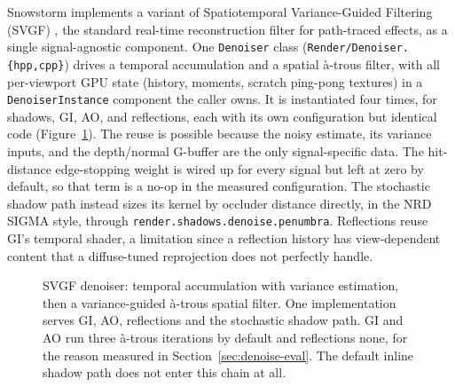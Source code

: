 Snowstorm implements a variant of Spatiotemporal Variance-Guided Filtering (SVGF)
\cite{schied2017svgf}, the standard real-time reconstruction filter for path-traced effects, as a
single signal-agnostic component. One \texttt{Denoiser} class (\texttt{Render/Denoiser.\{hpp,cpp\}})
drives a temporal accumulation and a spatial \`a-trous filter, with all per-viewport GPU state
(history, moments, scratch ping-pong textures) in a \texttt{DenoiserInstance} component the caller
owns. It is instantiated four times, for shadows, GI, AO, and reflections, each with its own
configuration but identical code (Figure~\ref{fig:svgf}). The reuse is possible because the noisy
estimate, its variance inputs, and the depth/normal G-buffer are the only signal-specific data. The
hit-distance
edge-stopping weight is wired up for every signal but left at zero by default, so that term is a
no-op in the measured configuration. The stochastic shadow path instead sizes its kernel by occluder
distance directly, in the NRD SIGMA style, through \texttt{render.shadows.denoise.penumbra}.
Reflections reuse GI's temporal shader, a limitation since a reflection history has view-dependent
content that a diffuse-tuned reprojection does not perfectly handle.

\begin{figure}[tbp]
\centering
{}
\caption[The shared SVGF denoiser]{SVGF denoiser: temporal accumulation with variance estimation,
then a variance-guided \`a-trous spatial filter. One implementation serves GI, AO, reflections and
the stochastic shadow path. GI and AO run three \`a-trous iterations by default and reflections none,
for the reason measured in Section~\ref{sec:denoise-eval}. The default inline shadow path does not
enter this chain at all.}
\label{fig:svgf}
\end{figure}

